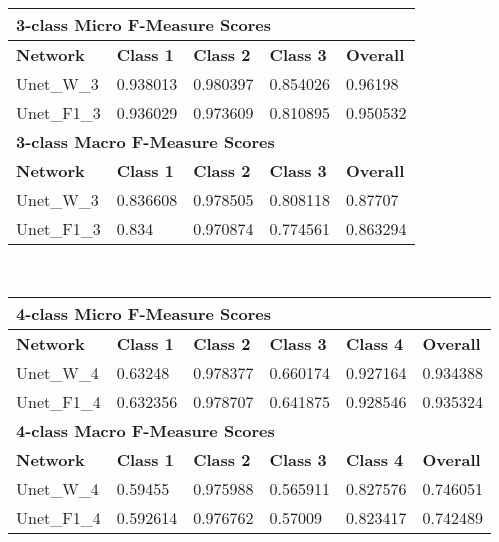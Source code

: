 \begin {table}
	\begin{flushleft}
		\begin {tabular}[!htb]{|l|l|l|l|l|}
			\hline\multicolumn{5}{|l|}{\textbf{3-class Micro F-Measure Scores}} \\ \hline
			\textbf{Network}& \textbf{Class 1}& \textbf{Class 2}& \textbf{Class 3}& \textbf{Overall} \\ \hline
			Unet\_W\_3& \cellcolor{green!25}0.938013& \cellcolor{green!25}0.980397& \cellcolor{green!25}0.854026& \cellcolor{green!25}0.96198 \\ \hline
			Unet\_F1\_3& 0.936029& 0.973609& 0.810895&  0.950532\\ \hline
			\multicolumn{5}{|l|}{\textbf{3-class Macro F-Measure Scores}} \\ \hline
			\textbf{Network}& \textbf{Class 1}& \textbf{Class 2}& \textbf{Class 3}& \textbf{Overall} \\ \hline
			Unet\_W\_3& \cellcolor{green!25}0.836608& \cellcolor{green!25}0.978505& \cellcolor{green!25}0.808118& \cellcolor{green!25}0.87707 \\ \hline
			Unet\_F1\_3& 0.834&  0.970874& 0.774561& 0.863294 \\ \hline
		\end {tabular}
		\vspace{0.5cm}\\
		\begin {tabular}[!htb]{|l|l|l|l|l|l|}
			\hline\multicolumn{6}{|l|}{\textbf{4-class Micro F-Measure Scores}} \\ \hline
			\textbf{Network}& \textbf{Class 1}& \textbf{Class 2}& \textbf{Class 3}& \textbf{Class 4}& \textbf{Overall} \\ \hline
			Unet\_W\_4& \cellcolor{green!25}0.63248& 0.978377& \cellcolor{green!25}0.660174& 0.927164& 0.934388 \\ \hline
			Unet\_F1\_4& 0.632356& \cellcolor{green!25}0.978707& 0.641875& \cellcolor{green!25}0.928546& \cellcolor{green!25}0.935324 \\ \hline
			\multicolumn{6}{|l|}{\textbf{4-class Macro F-Measure Scores}} \\ \hline
			\textbf{Network}& \textbf{Class 1}& \textbf{Class 2}& \textbf{Class 3}& \textbf{Class 4}& \textbf{Overall} \\ \hline
			Unet\_W\_4& \cellcolor{green!25}0.59455& 0.975988& 0.565911& \cellcolor{green!25}0.827576& \cellcolor{green!25}0.746051 \\ \hline
			Unet\_F1\_4& 0.592614& \cellcolor{green!25}0.976762& \cellcolor{green!25}0.57009& 0.823417& 0.742489 \\ \hline
		\end {tabular}
	\end {flushleft}


\end{table}
